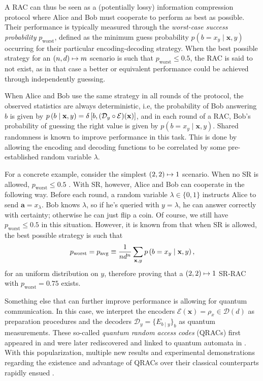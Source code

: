 			A RAC can thus be seen as a (potentially lossy) information compression protocol where Alice and Bob must cooperate to perform as best as possible. Their performance is typically measured through the \emph{worst-case success probability} $p_{\text{worst}}$, defined as the minimum guess probability $p(b = x_y \mid \mathbf{x}, y)$ occurring for their particular encoding-decoding strategy. When the best possible strategy for an $\left( n, d \right) \mapsto m$ scenario is such that $p_{\text{worst}} \leq 0.5$, the RAC is said to not exist, as in that case a better or equivalent performance could be achieved through independently guessing.

            When Alice and Bob use the same strategy in all rounds of the protocol, the observed statistics are always deterministic, i.e, the probability of Bob answering $b$ is given by $p \left( b \mid \mathbf{x}, y \right) = \delta\left[b, (\mathcal{D}_{y} \circ \mathcal{E})(\mathbf{x})\right]$, and in each round of a RAC, Bob's probability of guessing the right value is given by $p(b = x_y \mid \mathbf{x}, y)$. Shared randomness is known to improve performance in this task. This is done by allowing the encoding and decoding functions to be correlated by some pre-established random variable $\lambda$.
			
			For a concrete example, consider the simplest $\left( 2, 2 \right) \mapsto 1$ scenario. When no SR is allowed, $p_{\text{worst}} \leq 0.5$ \cite{ambainis_qracsoriginal_1999}. With SR, however, Alice and Bob can cooperate in the following way. Before each round, a random variable $\lambda \in \{0, 1\}$ instructs Alice to send $\mathbf{a} = x_\lambda$. Bob knows $\lambda$, so if he's queried with $y = \lambda$, he can answer correctly with certainty; otherwise he can just flip a coin. Of course, we still have $p_{\text{worst}} \leq 0.5$ in this situation. However, it is known from \cite{ambainis_srqracs_2009} that when SR is allowed, the best possible strategy is such that 
            \begin{equation}
                p_{\text{worst}} = p_{\text{avg}} \equiv \frac{1}{nd^n} \sum_{\mathbf{x},y} p \left( b=x_y \mid \mathbf{x},y \right) ,
                \label{eq:rac-p-avg}
            \end{equation}
            for an uniform distribution on $y$, therefore proving that a $\left( 2, 2 \right) \mapsto 1$ SR-RAC with $p_{\text{worst}} = 0.75$ exists.

            Something else that can further improve performance is allowing for quantum communication. In this case, we interpret the encoders $\mathcal{E}(\mathbf{x}) = \rho_x \in \mathcal{D}(d)$ as preparation procedures and the decoders $\mathcal{D}_y = \{ E_{b \mid y} \}_b$ as quantum measurements. These so-called \emph{quantum random access codes} (QRACs) first appeared in \cite{wiesner1983conjugate} and were later rediscovered and linked to quantum automata in \cite{ambainis_qracsoriginal_1999}. With this popularization, multiple new results and experimental demonstrations regarding the existence and advantage of QRACs over their classical counterparts rapidly ensued \cite{nayak1999optimal,ambainis2002dense,hayashi_41qracs_2006,ambainis_srqracs_2009,spekkens2009preparation,pawlowski_pamqkd_2011}.

